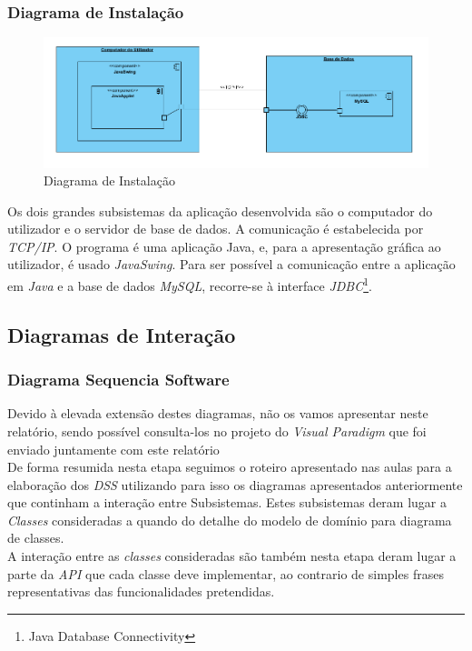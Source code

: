 \documentclass[a4paper,12pt]{report}
\begin{document}
\subsubsection{Diagrama de Instalação}

\begin{figure}[H]
	\includegraphics[width=1.2\textwidth]{media/dig_instalacao.png}
	 \caption{Diagrama de Instalação}
\end{figure}

Os dois grandes subsistemas da aplicação desenvolvida são o computador do utilizador e o servidor de base de dados. A comunicação é estabelecida por \emph{TCP/IP}. O programa é uma aplicação Java, e, para a apresentação gráfica ao utilizador, é usado \emph{JavaSwing}. Para ser possível a comunicação entre a aplicação em \emph{Java} e a base de dados \emph{MySQL}, recorre-se à interface \emph{JDBC}\footnote{Java Database Connectivity}.


\newpage
\subsection{Diagramas de Interação}
\subsubsection{Diagrama Sequencia Software}
Devido à elevada extensão destes diagramas, não os vamos apresentar neste relatório, sendo possível consulta-los no projeto do \emph{Visual Paradigm} que foi enviado juntamente com este relatório
\\\indent De forma resumida nesta etapa seguimos o roteiro apresentado nas aulas para a elaboração dos \emph{DSS} utilizando para isso os diagramas apresentados anteriormente que continham a interação entre Subsistemas. Estes subsistemas deram lugar a \emph{Classes} consideradas a quando do detalhe do modelo de domínio para diagrama de classes.
\\\indent A interação entre as \emph{classes} consideradas são também nesta etapa deram lugar a parte da \emph{API} que cada classe deve implementar, ao contrario de simples frases representativas das funcionalidades pretendidas.
\newpage
\end{document}
